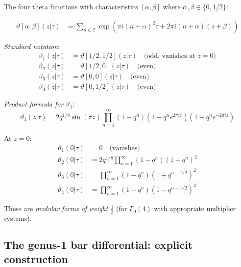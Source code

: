 \begin{definition}
\label{def:jacobi-theta}
The four theta functions with characteristics $[\alpha, \beta]$ where $\alpha, \beta \in \{0, 1/2\}$:

\begin{align}
\vartheta[\alpha, \beta](z|\tau) &= \sum_{n \in \mathbb{Z}} \exp\left(\pi i (n+\alpha)^2 \tau + 2\pi i (n+\alpha)(z+\beta)\right)
\end{align}

\emph{Standard notation}:
\begin{align}
\vartheta_1(z|\tau) &= \vartheta[1/2, 1/2](z|\tau) \quad \text{(odd, vanishes at } z=0\text{)} \\
\vartheta_2(z|\tau) &= \vartheta[1/2, 0](z|\tau) \quad \text{(even)} \\
\vartheta_3(z|\tau) &= \vartheta[0, 0](z|\tau) \quad \text{(even)} \\
\vartheta_4(z|\tau) &= \vartheta[0, 1/2](z|\tau) \quad \text{(even)}
\end{align}

\emph{Product formula for $\vartheta_1$}:
\begin{equation}
\vartheta_1(z|\tau) = 2q^{1/8}\sin(\pi z) \prod_{n=1}^{\infty} (1-q^n)(1-q^n e^{2\pi i z})(1-q^n e^{-2\pi i z})
\end{equation}
\end{definition}

\begin{theorem}
\label{thm:theta-zero}
At $z = 0$:
\begin{align}
\vartheta_1(0|\tau) &= 0 \quad \text{(vanishes)} \\
\vartheta_2(0|\tau) &= 2q^{1/8} \prod_{n=1}^{\infty} (1-q^n)(1+q^n)^2 \\
\vartheta_3(0|\tau) &= \prod_{n=1}^{\infty} (1-q^n)(1+q^{n-1/2})^2 \\
\vartheta_4(0|\tau) &= \prod_{n=1}^{\infty} (1-q^n)(1-q^{n-1/2})^2
\end{align}

These are \emph{modular forms of weight $\frac{1}{2}$} (for $\Gamma_0(4)$ with appropriate multiplier systems).
\end{theorem}

\subsection{The genus-1 bar differential: explicit construction}

